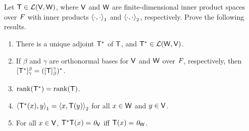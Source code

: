 \begin{ex}\label{ex:6.3.15}
  Let \(\mathsf{T} \in \mathcal{L}(\mathsf{V}, \mathsf{W})\), where \(\mathsf{V}\) and \(\mathsf{W}\) are finite-dimensional inner product spaces over \(\mathit{F}\) with inner products \(\left\langle\cdot, \cdot\right\rangle_1\) and \(\left\langle\cdot, \cdot\right\rangle_2\), respectively.
  Prove the following results.
  \begin{enumerate}
    \item There is a unique adjoint \(\mathsf{T}^*\) of \(\mathsf{T}\), and \(\mathsf{T}^* \in \mathcal{L}(\mathsf{W}, \mathsf{V})\).
    \item If \(\beta\) and \(\gamma\) are orthonormal bases for \(\mathsf{V}\) and \(\mathsf{W}\) over \(\mathit{F}\), respectively, then \([\mathsf{T}^*]_{\gamma}^{\beta} = ([\mathsf{T}]_{\beta}^{\gamma})^*\).
    \item \(\rk{\T^*} = \rk{\T}\).
    \item \(\left\langle\mathsf{T}^*(x), y\right\rangle_1 = \left\langle x, \mathsf{T}(y)\right\rangle_2\) for all \(x \in \mathsf{W}\) and \(y \in \mathsf{V}\).
    \item For all \(x \in \mathsf{V}\), \(\mathsf{T}^* \mathsf{T}(x) = \mathit{0}_{\mathsf{V}}\) iff \(\mathsf{T}(x) = \mathit{0}_{\mathsf{W}}\).
  \end{enumerate}
\end{ex}

